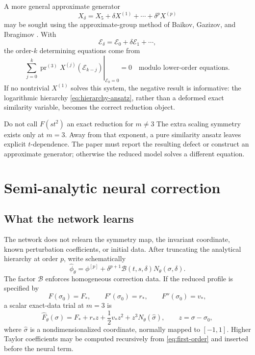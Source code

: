 \documentclass[11pt]{article}
\newcommand{\E}{\mathcal E}
\newcommand{\pr}{\operatorname{pr}}
\begin{document}
A more general approximate generator
\begin{equation}
 X_\delta=X_5+\delta X^{(1)}+\cdots+\delta^pX^{(p)}
 \label{eq:approx-generator}
\end{equation}
may be sought using the approximate-group method of Baikov, Gazizov, and Ibragimov \cite{baikov1989}.  With
\begin{equation}
 \E_\delta=\E_0+\delta\E_1+\cdots,
\end{equation}
the order-$k$ determining equations come from
\begin{equation}
 \left.\sum_{j=0}^{k}\pr^{(3)}X^{(j)}(\E_{k-j})\right|_{\E_0=0}=0
 \quad\text{modulo lower-order equations}.
 \label{eq:approx-determining}
\end{equation}
If no nontrivial $X^{(1)}$ solves this system, the negative result is informative: the logarithmic hierarchy \cref{eq:hierarchy-ansatz}, rather than a deformed exact similarity variable, becomes the correct reduction object.

\begin{warningbox}{Do not call $F(st^2)$ an exact reduction for $m\ne3$}
The extra scaling symmetry exists only at $m=3$.  Away from that exponent, a pure similarity ansatz leaves explicit $t$-dependence.  The paper must report the resulting defect or construct an approximate generator; otherwise the reduced model solves a different equation.
\end{warningbox}

\section{Semi-analytic neural correction}

\subsection{What the network learns}

The network does not relearn the symmetry map, the invariant coordinate, known perturbation coefficients, or initial data.  After truncating the analytical hierarchy at order $p$, write schematically
\begin{equation}
 \widehat\phi_\theta
 =\phi^{[p]}+\delta^{p+1}\mathcal B(t,s,\delta)
   N_\theta(\sigma,\delta).
 \label{eq:neural-lift}
\end{equation}
The factor $\mathcal B$ enforces homogeneous correction data.  If the reduced profile is specified by
\begin{equation}
 F(\sigma_0)=F_*,\qquad F'(\sigma_0)=r_*,\qquad F''(\sigma_0)=v_*,
 \label{eq:profile-data}
\end{equation}
a scalar exact-data trial at $m=3$ is
\begin{equation}
 \widehat F_\theta(\sigma)
 =F_*+r_*z+\frac12v_*z^2+z^3N_\theta(\widehat\sigma),
 \qquad z=\sigma-\sigma_0,
 \label{eq:hard-trial}
\end{equation}
where $\widehat\sigma$ is a nondimensionalized coordinate, normally mapped to $[-1,1]$.  Higher Taylor coefficients may be computed recursively from \cref{eq:first-order} and inserted before the neural term.
\end{document}
